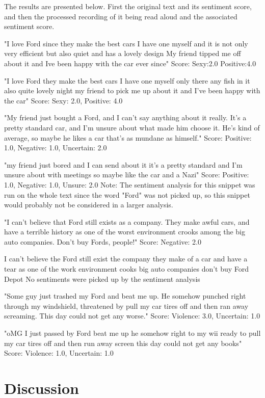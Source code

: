 \documentclass[a4paper,12pt,twoside]{ltxdoc}
\begin{document}
The results are presented below. First the original text and its sentiment score, and then the processed recording of it being read aloud and the associated sentiment score.

"I love Ford since they make the best cars I have one myself and it is not only very efficient but also quiet and has a lovely design My friend tipped me off about it and Ive been happy with the car ever since"
Score: Sexy:2.0 Positive:4.0

"I love Ford they make the best cars I have one myself only there any fish in it also quite lovely night my friend to pick me up about it and I've been happy with the car"
Score: Sexy: 2.0, Positive: 4.0

"My friend just bought a Ford, and I can't say anything about it really. It's a pretty standard car, and I'm unsure about what made him choose it. He's kind of average, so maybe he likes a car that's as mundane as himself."
Score: Positive: 1.0, Negative: 1.0, Uncertain: 2.0

"my friend just bored and I can send about it it's a pretty standard and I'm unsure about with meetings so maybe like the car and a Nazi"
Score: Positive: 1.0, Negative: 1.0, Unsure: 2.0
Note: The sentiment analysis for this snippet was run on the whole text since the word "Ford" was not picked up, so this snippet would probably not be considered in a larger analysis.

"I can't believe that Ford still exists as a company. They make awful cars, and have a terrible history as one of the worst environment crooks among the big auto companies. Don't buy Fords, people!"
Score: Negative: 2.0

I can't believe the Ford still exist the company they make of a car and have a tear as one of the work environment cooks big auto companies don't buy Ford Depot
No sentiments were picked up by the sentiment analysis

"Some guy just trashed my Ford and beat me up. He somehow punched right through my windshield, threatened by pull my car tires off and then ran away screaming. This day could not get any worse."
Score: Violence: 3.0, Uncertain: 1.0

"oMG I just passed by Ford beat me up he somehow right to my wii ready to pull my car tires off and then run away screen this day could not get any books"
Score: Violence: 1.0, Uncertain: 1.0

\section{Discussion}
\end{document}
